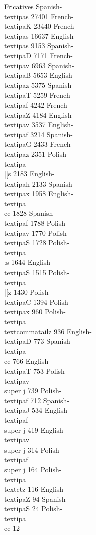 Fricatives
Spanish-\\textipa{s}			27401
French-\\textipa{K}			23440
French-\\textipa{s}			16637
English-\\textipa{s}			9153
Spanish-\\textipa{D}			7171
French-\\textipa{v}			6963
Spanish-\\textipa{B}			5653
English-\\textipa{z}			5375
Spanish-\\textipa{T}			5259
French-\\textipa{f}			4242
French-\\textipa{Z}			4184
English-\\textipa{v}			3537
English-\\textipa{f}			3214
Spanish-\\textipa{G}			2433
French-\\textipa{z}			2351
Polish-\\textipa{\\|[{s}}		2183
English-\\textipa{h}			2133
Spanish-\\textipa{x}			1958
English-\\textipa{\\c{c}}		1828
Spanish-\\textipa{f}			1788
Polish-\\textipa{v}			1770
Polish-\\textipa{S}			1728
Polish-\\textipa{\\:s}			1644
English-\\textipa{S}			1515
Polish-\\textipa{\\|[{z}}		1430
Polish-\\textipa{C}			1394
Polish-\\textipa{x}			960
Polish-\\textipa{\\textcommatailz}	936
English-\\textipa{D}			773
Spanish-\\textipa{\\c{c}}		766
English-\\textipa{T}			753
Polish-\\textipa{v\\super j}		739
Polish-\\textipa{f}			712
Spanish-\\textipa{J}			534
English-\\textipa{f\\super j}		419
English-\\textipa{v\\super j}		314
Polish-\\textipa{f\\super j}		164
Polish-\\textipa{\\textctz}		116
English-\\textipa{Z}			94
Spanish-\\textipa{S}			24
Polish-\\textipa{\\c{c}}		12

